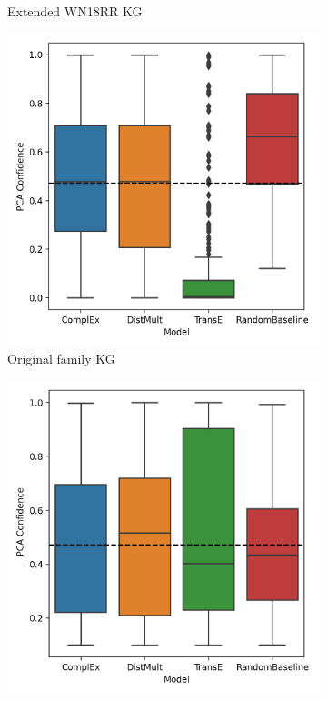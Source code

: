 \begin{figure}[htbp]
\begin{subfigure}{.5\textwidth}
  \caption{Extended WN18RR KG}
  \label{fig:_PCA_models_wn18rr_boxplot_sub}
\end{subfigure}
\begin{subfigure}{.5\textwidth}
  \centering
  \includegraphics[width=1\linewidth]{figures/results/PCA_models/PCA-models_family.png}
  \caption{Original family KG}
  \label{fig:models_family_boxplot_sub}
\end{subfigure}%
\begin{subfigure}{.5\textwidth}
  \centering
  \includegraphics[width=1\linewidth]{figures/results/PCA_models/_PCA-models_family.png}

\end{subfigure}
\end{figure}
